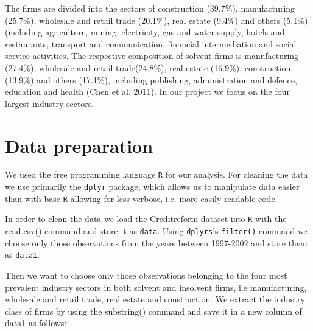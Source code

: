 \documentclass{article}
\begin{document}

The firms are divided into the sectors of construction (39.7\%), manufacturing (25.7\%), wholesale and retail trade (20.1\%), real estate (9.4\%) and others (5.1\%) (including agriculture, mining, electricity, gas and water supply, hotels and restaurants, transport and communication, financial intermediation and social service activities. The respective composition of solvent firms is manufacturing (27.4\%), wholesale and retail trade(24.8\%), real estate (16.9\%), construction (13.9\%) and others (17.1\%), including publishing, administration and defence, education and health (Chen et al. 2011). In our project we focus on the four largest industry sectors.

\section{Data preparation}

We used the free programming language \texttt{R} for our analysis. For cleaning the data we use primarily the \texttt{dplyr} package, which allows us to manipulate data easier than with base \texttt{R} allowing for less verbose, i.e. more easily readable code. 

In order to clean the data we load the Creditreform dataset into \texttt{R} with the read.csv() command and store it as \texttt{data}. Using \texttt{dplyrs}'s \texttt{filter()} command we choose only those observations from the years between 1997-2002 and store them as \texttt{data1}.



Then we want to choose only those observations belonging to the four most prevalent industry sectors in both solvent and insolvent firms, i.e manufacturing, wholesale and retail trade, real estate and construction. We extract the industry class of firms by using the substring() command and save it in a new column of data1 as follows:
\end{document}
